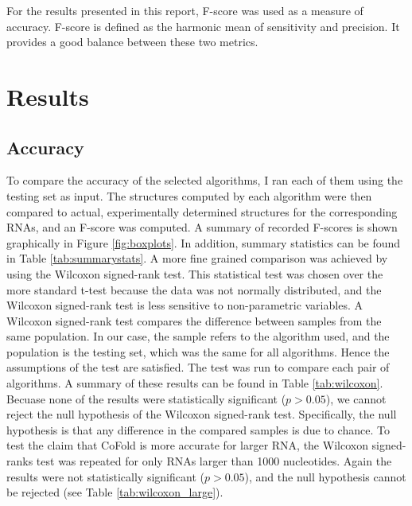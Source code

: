 \documentclass[12pt, a4paper]{article}
\begin{document}
For the results presented in this report, F-score was used as a measure of accuracy. F-score is defined as the harmonic mean of sensitivity and precision. It provides a good balance between these two metrics.

\section{Results}
\label{sec:results}
\subsection{Accuracy}
To compare the accuracy of the selected algorithms, I ran each of them using the testing set as input. The structures computed by each algorithm were then compared to actual, experimentally determined structures for the corresponding RNAs, and an F-score was computed. A summary of recorded F-scores is shown graphically in Figure \ref{fig:boxplots}. In addition, summary statistics can be found in Table \ref{tab:summarystats}. A more fine grained comparison was achieved by using the Wilcoxon signed-rank test. This statistical test was chosen over the more standard t-test because the data was not normally distributed, and the Wilcoxon signed-rank test is less sensitive to non-parametric variables. A Wilcoxon signed-rank test compares the difference between samples from the same population. In our case, the sample refers to the algorithm used, and the population is the testing set, which was the same for all algorithms. Hence the assumptions of the test are satisfied. The test was run to compare each pair of algorithms. A summary of these results can be found in Table \ref{tab:wilcoxon}. Becuase none of the results were statistically significant ($p > 0.05$), we cannot reject the null hypothesis of the Wilcoxon signed-rank test. Specifically, the null hypothesis is that any difference in the compared samples is due to chance. To test the claim that CoFold is more accurate for larger RNA, the Wilcoxon signed-ranks test was repeated for only RNAs larger than 1000 nucleotides. Again the results were not statistically significant ($p > 0.05$), and the null hypothesis cannot be rejected (see Table \ref{tab:wilcoxon_large}).
\end{document}
